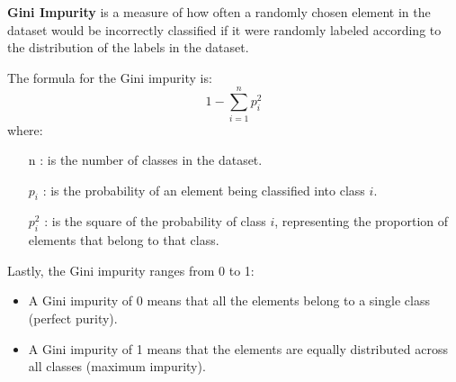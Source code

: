 \documentclass[12pt,letterpaper]{article}
\begin{document}
\vspace{.2in}

\textbf{Gini Impurity} is a measure of how often a randomly chosen element in the dataset would be incorrectly classified if it were randomly labeled according to the distribution of the labels in the dataset.

The formula for the Gini impurity is:
\[
    1 - \sum_{i=1}^{n} p_{i}^{2}
\]
where:
\begin{itemize}
    \item[n]: is the number of classes in the dataset.
    \item[\(p_{i}\)]: is the probability of an element being classified into class \(i\).
    \item[\(p_{i}^{2}\)]: is the square of the probability of class \(i\), representing the proportion of elements that belong to that class.
\end{itemize}

Lastly, the Gini impurity ranges from 0 to 1:
\begin{itemize}
    \item A Gini impurity of 0 means that all the elements belong to a single class (perfect purity).
    \item A Gini impurity of 1 means that the elements are equally distributed across all classes (maximum impurity).
\end{itemize}
\end{document}

